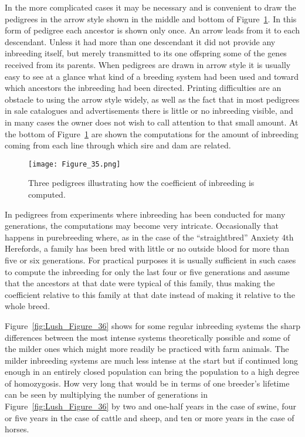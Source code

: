 In the more complicated cases it may be necessary and is convenient
to draw the pedigrees in the arrow style shown in the middle and bottom
of Figure~\ref{fig:Lush_Figure_35}. In this form of pedigree each ancestor is shown only
once. An arrow leads from it to each descendant. Unless it had more
than one descendant it did not provide any inbreeding itself, but merely
transmitted to its one offspring some of the genes received from its
parents. When pedigrees are drawn in arrow style it is usually easy to
see at a glance what kind of a breeding system had been used and
toward which ancestors the inbreeding had been directed. Printing
difficulties are an obstacle to using the arrow style widely, as well as the
fact that in most pedigrees in sale catalogues and advertisements there is
little or no inbreeding visible, and in many cases the owner does not
wish to call attention to that small amount. At the bottom of Figure~\ref{fig:Lush_Figure_35}
are shown the computations for the amount of inbreeding coming from
each line through which sire and dam are related.

\begin{figure}
	\centering
    \texttt{[image: Figure\_35.png]}
    \caption{Three pedigrees illustrating how the coefficient of inbreeding is computed.}
    \label{fig:Lush_Figure_35}
\end{figure}

In pedigrees from experiments where inbreeding has been conducted
for many generations, the computations may become very intricate.
Occasionally that happens in purebreeding where, as in the case of
the ``straightbred'' Anxiety 4th Herefords, a family has been bred with
little or no outside blood for more than five or six generations. For
practical purposes it is usually sufficient in such cases to compute the
inbreeding for only the last four or five generations and assume that the
ancestors at that date were typical of this family, thus making the coefficient
relative to this family at that date instead of making it relative to
the whole breed.

Figure~\ref{fig:Lush_Figure_36} shows for some regular inbreeding systems the sharp differences
between the most intense systems theoretically possible and
some of the milder ones which might more readily be practiced with
farm animals. The milder inbreeding systems are much less intense at
the start but if continued long enough in an entirely closed population
can bring the population to a high degree of homozygosis. How very
long that would be in terms of one breeder's lifetime can be seen by
multiplying the number of generations in Figure~\ref{fig:Lush_Figure_36} by two and one-half
years in the case of swine, four or five years in the case of cattle and
sheep, and ten or more years in the case of horses.

